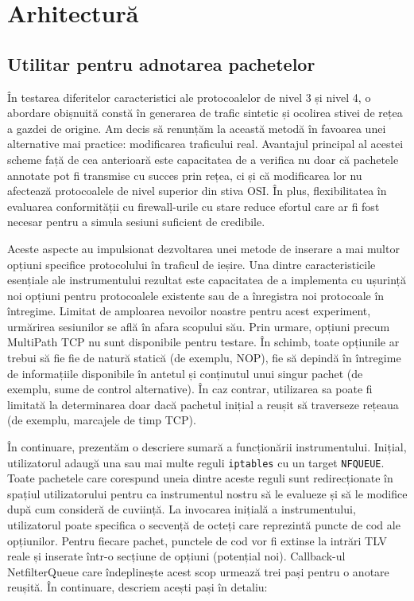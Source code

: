 \section{Arhitectură}

\subsection{Utilitar pentru adnotarea pachetelor}

În testarea diferitelor caracteristici ale protocoalelor de nivel 3 și nivel 4, o abordare obișnuită constă în generarea de trafic sintetic și ocolirea stivei de rețea a gazdei de origine. Am decis să renunțăm la această metodă în favoarea unei alternative mai practice: modificarea traficului real. Avantajul principal al acestei scheme față de cea anterioară este capacitatea de a verifica nu doar că pachetele annotate pot fi transmise cu succes prin rețea, ci și că modificarea lor nu afectează protocoalele de nivel superior din stiva OSI. În plus, flexibilitatea în evaluarea conformității cu firewall-urile cu stare reduce efortul care ar fi fost necesar pentru a simula sesiuni suficient de credibile.

Aceste aspecte au impulsionat dezvoltarea unei metode de inserare a mai multor opțiuni specifice protocolului în traficul de ieșire. Una dintre caracteristicile esențiale ale instrumentului rezultat este capacitatea de a implementa cu ușurință noi opțiuni pentru protocoalele existente sau de a înregistra noi protocoale în întregime. Limitat de amploarea nevoilor noastre pentru acest experiment, urmărirea sesiunilor se află în afara scopului său. Prin urmare, opțiuni precum MultiPath TCP nu sunt disponibile pentru testare. În schimb, toate opțiunile ar trebui să fie fie de natură statică (de exemplu, NOP), fie să depindă în întregime de informațiile disponibile în antetul și conținutul unui singur pachet (de exemplu, sume de control alternative). În caz contrar, utilizarea sa poate fi limitată la determinarea doar dacă pachetul inițial a reușit să traverseze rețeaua (de exemplu, marcajele de timp TCP).

În continuare, prezentăm o descriere sumară a funcționării instrumentului. Inițial, utilizatorul adaugă una sau mai multe reguli \texttt{iptables} cu un target \texttt{NFQUEUE}. Toate pachetele care corespund uneia dintre aceste reguli sunt redirecționate în spațiul utilizatorului pentru ca instrumentul nostru să le evalueze și să le modifice după cum consideră de cuviință. La invocarea inițială a instrumentului, utilizatorul poate specifica o secvență de octeți care reprezintă puncte de cod ale opțiunilor. Pentru fiecare pachet, punctele de cod vor fi extinse la intrări TLV reale și inserate într-o secțiune de opțiuni (potențial noi). Callback-ul NetfilterQueue care îndeplinește acest scop urmează trei pași pentru o anotare reușită. În continuare, descriem acești pași în detaliu:

